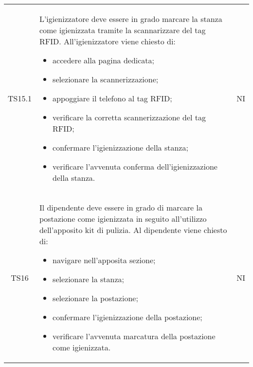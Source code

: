 {\begin{longtable}{ c C{11cm} c }
        TS15.1&
        \begin{flushleft}
            L'igienizzatore deve essere in grado marcare la stanza come igienizzata tramite la scannarizzare del tag RFID.
            All'igienizzatore viene chiesto di:
        \end{flushleft}
        \begin{itemize}
            \item accedere alla pagina dedicata;
            \item selezionare la scannerizzazione;
            \item appoggiare il telefono al tag RFID;
            \item verificare la corretta scannerizzazione del tag RFID;
            \item confermare l'igienizzazione della stanza;
            \item verificare l'avvenuta conferma dell'igienizzazione della stanza.
        \end{itemize}&
        NI\\

        TS16&
        \begin{flushleft}
            Il dipendente deve essere in grado di marcare la postazione come igienizzata in seguito all'utilizzo dell'apposito kit di pulizia.
            Al dipendente viene chiesto di:
        \end{flushleft}
        \begin{itemize}
            \item navigare nell'apposita sezione;
            \item selezionare la stanza;
            \item selezionare la postazione;
            \item confermare l'igienizzazione della postazione;
            \item verificare l'avvenuta marcatura della postazione come igienizzata.
        \end{itemize}&
        NI\\


\end{longtable}}
